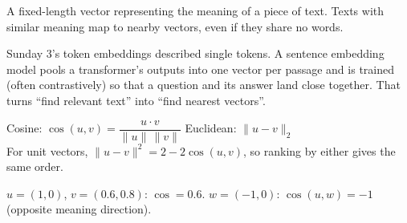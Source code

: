 \documentclass[11pt,a4paper]{article}
\begin{document}
\begin{bdef}
A fixed-length vector representing the meaning of a piece of text. Texts with similar meaning map to nearby vectors, even if they share no words.
\end{bdef}
Sunday 3's token embeddings described single tokens. A sentence embedding model pools a transformer's outputs into one vector per passage and is trained (often contrastively) so that a question and its answer land close together. That turns ``find relevant text'' into ``find nearest vectors''.
\begin{bmath}
Cosine: $\cos(u,v)=\dfrac{u\cdot v}{\lVert u\rVert\,\lVert v\rVert}$ \qquad Euclidean: $\lVert u-v\rVert_2$\\[3pt]
For unit vectors, $\lVert u-v\rVert^2=2-2\cos(u,v)$, so ranking by either gives the same order.
\end{bmath}
\begin{bex}[By hand]
$u=(1,0)$, $v=(0.6,0.8)$: $\cos=0.6$. $w=(-1,0)$: $\cos(u,w)=-1$ (opposite meaning direction).
\end{bex}
\end{document}
